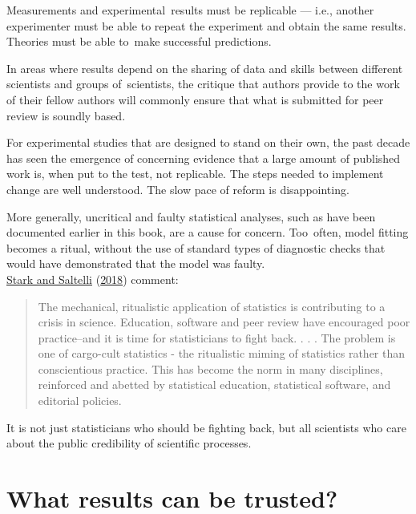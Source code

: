 \documentclass[
  10pt,
  b5paper]{book}
\begin{document}
Measurements and experimental~results must be replicable
--- i.e., another experimenter must be able to repeat the
experiment and obtain the same results. Theories must
be able to~make successful predictions.

In areas where results depend on the sharing of data and
skills between different scientists and groups of~scientists,
the critique that authors provide to the work of their fellow
authors will commonly ensure that what is submitted for peer
review is soundly based.

For experimental studies that are designed to stand on
their own, the past decade has seen the emergence of
concerning evidence that a large amount of published
work is, when put to the test, not replicable. The
steps needed to implement change are well understood.
The slow pace of reform is disappointing.

More generally, uncritical and faulty statistical analyses,
such as have been documented earlier in this book, are a
cause for concern. Too~often, model fitting becomes a ritual,
without the use of standard types of diagnostic checks that
would have demonstrated that the model was faulty.\\
\protect\hyperlink{ref-stark2018cargo}{Stark and Saltelli} (\protect\hyperlink{ref-stark2018cargo}{2018}) comment:

\begin{quote}
The mechanical, ritualistic application of statistics is contributing to a crisis in science. Education, software and peer review have encouraged poor practice--and it is time for statisticians to fight back.
. . .
The problem is one of cargo-cult statistics - the ritualistic miming of
statistics rather than conscientious practice. This has become the norm
in many disciplines, reinforced and abetted by statistical education,
statistical software, and editorial policies.
\end{quote}

It is not just statisticians who should be fighting back, but all
scientists who care about the public credibility of scientific processes.

\hypertarget{what-results-can-be-trusted}{%
\section{What results can be trusted?}\label{what-results-can-be-trusted}}
\end{document}
